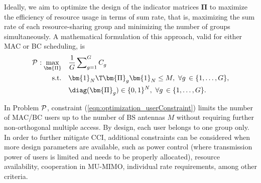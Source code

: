 
Ideally, we aim to optimize the design of the indicator matrices $\bm{\Pi}$ to maximize the efficiency of resource usage in terms of sum rate, that is, maximizing the sum rate of each resource-sharing group and minimizing the number of groups simultaneously.
A mathematical formulation of this approach, valid for either MAC or BC scheduling, is %
\begin{subequations}\label{eqn:sumrate_optimization}
	\begin{align}
		\mathcal{P}^{}:\max_{\bm{\Pi}} &\quad\frac{1}{G}\sum\nolimits_{g =1}^{G} C_g^{}\label{eqn:optimization_obj}\\
		\text{s.t.}  
		&\quad\bm{1}_N\T\bm{\Pi}_{g}\bm{1}_N\leq M,\,\, \forall g\,\in\{1,\ldots,G\},\label{eqn:optimization_userConstraint}\\
		&\quad\diag(\bm{\Pi}_g)\in\{0,1\}^N,\,\, \forall g\,\in\{1,\ldots,G\}.\label{eqn:optimization_binaryExclisivity}
	\end{align}
\end{subequations}

In Problem ${\cal P}$, constraint (\ref{eqn:optimization_userConstraint}) limits the number of MAC/BC users up to the number of BS antennas $M$ without requiring further non-orthogonal multiple access. By design, each user belongs to one group only.
In order to further mitigate CCI, additional constraints can be considered when more design parameters are available, such as power control (where transmission power of users is limited and needs to be properly allocated), resource availability, cooperation in MU-MIMO, individual rate requirements, among other criteria.

